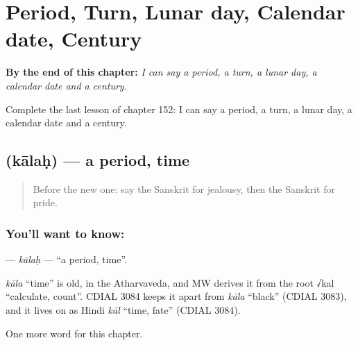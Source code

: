 
\chapter{Period, Turn, Lunar day, Calendar date, Century}
\label{ch:sa-period-turn-lunar-day-calendar-date-century}

\begin{chapteropening}
\textbf{By the end of this chapter:} \emph{I can say a period, a turn, a lunar day, a calendar date and a century.}

Complete the last lesson of chapter 152: I can say a period, a turn, a lunar day, a calendar date and a century.
\end{chapteropening}

\section[\texorpdfstring{\sk{कालः} (kālaḥ)}{कालः (kālaḥ)}]{ (kālaḥ) — a period, time}

\label{lesson:SA-C152-kalah}



\begin{quote}
Before the new one: say the Sanskrit for jealousy, then the Sanskrit for pride.
\end{quote}

\subsection*{You'll want to know: }
\textbf{} — \emph{kālaḥ} — \textquotedblleft{}a period, time\textquotedblright{}.

\begin{cousinweb}
\emph{kāla} \textquotedblleft{}time\textquotedblright{} is old, in the Atharvaveda, and MW derives it from the root √kal \textquotedblleft{}calculate, count\textquotedblright{}. CDIAL 3084 keeps it apart from \emph{kāla} \textquotedblleft{}black\textquotedblright{} (CDIAL 3083), and it lives on as Hindi \emph{kāl} \textquotedblleft{}time, fate\textquotedblright{} (CDIAL 3084).
\end{cousinweb}

\begin{grammarlens}[title={What you've built}]
One more word for this chapter.
\end{grammarlens}

